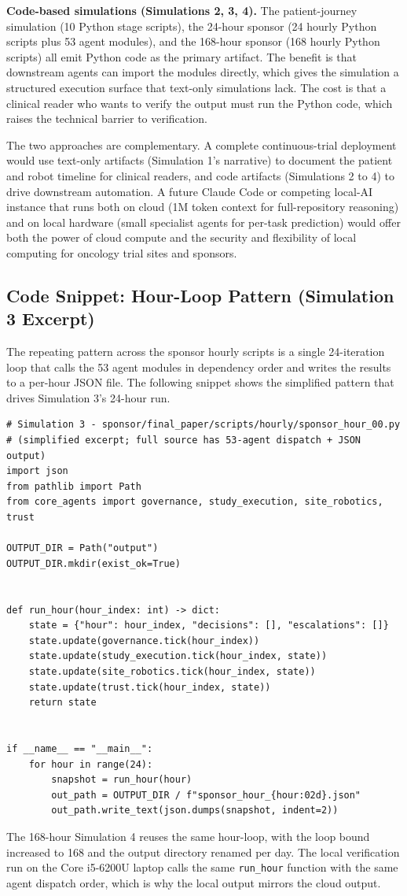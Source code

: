\textbf{Code-based simulations (Simulations 2, 3, 4).} The
patient-journey simulation (10 Python stage scripts), the 24-hour
sponsor (24 hourly Python scripts plus 53 agent modules), and the
168-hour sponsor (168 hourly Python scripts) all emit Python code as
the primary artifact. The benefit is that downstream agents can
import the modules directly, which gives the simulation a structured
execution surface that text-only simulations lack. The cost is that
a clinical reader who wants to verify the output must run the Python
code, which raises the technical barrier to verification.

The two approaches are complementary. A complete continuous-trial
deployment would use text-only artifacts (Simulation 1's narrative)
to document the patient and robot timeline for clinical readers, and
code artifacts (Simulations 2 to 4) to drive downstream automation.
A future Claude Code or competing local-AI instance that runs both on
cloud (1M token context for full-repository reasoning) and on local
hardware (small specialist agents for per-task prediction) would offer
both the power of cloud compute and the security and flexibility of
local computing for oncology trial sites and sponsors.

\subsection{Code Snippet: Hour-Loop Pattern (Simulation 3 Excerpt)}
\label{sec:methods-snippet}

The repeating pattern across the sponsor hourly scripts is a single
24-iteration loop that calls the 53 agent modules in dependency order
and writes the results to a per-hour JSON file. The following snippet
shows the simplified pattern that drives Simulation 3's 24-hour run.

\begin{lstlisting}
# Simulation 3 - sponsor/final_paper/scripts/hourly/sponsor_hour_00.py
# (simplified excerpt; full source has 53-agent dispatch + JSON output)
import json
from pathlib import Path
from core_agents import governance, study_execution, site_robotics, trust

OUTPUT_DIR = Path("output")
OUTPUT_DIR.mkdir(exist_ok=True)


def run_hour(hour_index: int) -> dict:
    state = {"hour": hour_index, "decisions": [], "escalations": []}
    state.update(governance.tick(hour_index))
    state.update(study_execution.tick(hour_index, state))
    state.update(site_robotics.tick(hour_index, state))
    state.update(trust.tick(hour_index, state))
    return state


if __name__ == "__main__":
    for hour in range(24):
        snapshot = run_hour(hour)
        out_path = OUTPUT_DIR / f"sponsor_hour_{hour:02d}.json"
        out_path.write_text(json.dumps(snapshot, indent=2))
\end{lstlisting}

The 168-hour Simulation 4 reuses the same hour-loop, with the loop
bound increased to 168 and the output directory renamed per day. The
local verification run on the Core i5-6200U laptop calls the same
\texttt{run\_hour} function with the same agent dispatch order, which
is why the local output mirrors the cloud output.
